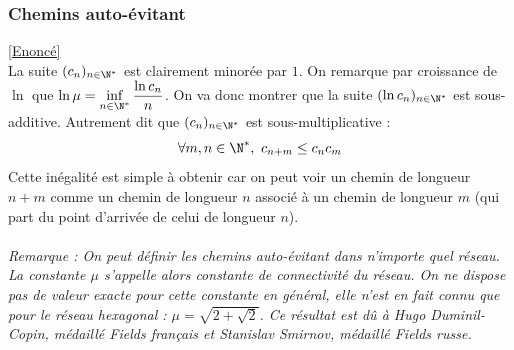 \documentclass{book}
\begin{document}
	\subsubsection{Chemins auto-évitant }
	\label{Chemins auto-évitant corrigé}
	\textcolor{blue}{\hyperref[Chemins auto-évitant]{[Enoncé]}}\\
	La suite $(c_n)_{n\in \N^*}$ est clairement minorée par $1$. On remarque par croissance de $\ln$ que $\ln\mu=\inf\limits_{n\in \N^*}\dfrac{\ln c_n}{n}$. On va donc montrer que la suite $(\ln c_n)_{n\in \N^*}$ est sous-additive. Autrement dit que $(c_n)_{n\in \N^*}$ est sous-multiplicative :
	$$\forall m,n\in \N^*,\ c_{n+m}\leq c_nc_m$$
	Cette inégalité est simple à obtenir car on peut voir un chemin de longueur $n+m$ comme un chemin de longueur $n$ associé à un chemin de longueur $m$ (qui part du point d'arrivée de celui de longueur $n$).\\\\
	\textit{Remarque : On peut définir les chemins auto-évitant dans n'importe quel réseau. La constante $\mu$ s'appelle alors constante de connectivité du réseau. On ne dispose pas de valeur exacte pour cette constante en général, elle n'est en fait connu que pour le réseau hexagonal : $\mu=\sqrt{2+\sqrt 2}$. Ce résultat est dû à Hugo Duminil-Copin, médaillé Fields français et Stanislav Smirnov, médaillé Fields russe.}
	
\end{document}
